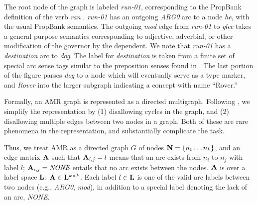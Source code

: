 \documentclass[11pt]{article}
\newcommand\w[1]{\textit{#1}} %
\newcommand\e[1]{\textit{#1}} %
\newcommand\n[1]{\textit{#1}} %
\begin{document}
The root node of the graph is labeled \n{run-01}, corresponding to the PropBank \cite{Palmer:2005} definition of the verb \w{ran} .
\w{run-01} has an outgoing \e{ARG0} arc to a node \w{he}, with the usual PropBank semantics.
The outgoing \e{mod} edge from \n{run-01} to \n{glee} takes a general purpose semantics corresponding to adjective, adverbial, or other modification of the governor by the dependent.
We note that \n{run-01} has a \e{destination} arc to \n{dog}.
The label for \e{destination} is taken from a finite set of special arc sense tags similar to the preposition senses found in \cite{Srikumar:2013}.
The last portion of the figure parses \w{dog} to a node which will eventually serve as a type marker, and \w{Rover} into the larger subgraph indicating a concept with name ``Rover.''

Formally, an AMR graph is represented as a directed multigraph.
Following , we simplify the representation by (1) disallowing
  cycles in the graph, and (2) disallowing multiple edges between two nodes in a
  graph.
Both of these are rare phenomena in the representation, and substantially complicate
  the task.

Thus, we treat AMR as a directed graph $G$ of nodes $\mathbf{N} = \{n_0 \dots n_k\}$, and
  an edge matrix $\mathbf{A}$ such that $\mathbf{A}_{i,j} = l$ means that an arc exists from $n_i$ to $n_j$ with label $l$;
  $\bA_{i,j} = \e{NONE}$ entails that no arc exists between the nodes.
  $\mathbf{A}$ is over a label space $\mathbf{L}$: $\mathbf{A} \in \mathbf{L}^{k \times k}$.
Each label $l \in \mathbf{L}$ is one of the valid arc labels between two nodes (e.g.,
  \e{ARG0}, \e{mod}), in addition to a special label denoting the lack of an arc, \e{NONE}.

\end{document}

